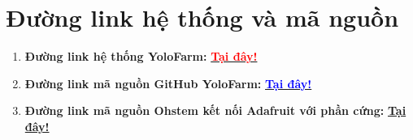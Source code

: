 \section{Đường link hệ thống và mã nguồn}
\begin{enumerate}[label=\textbf{\arabic*.}]
	\item \textbf{Đường link hệ thống YoloFarm:} \href{https://smart-farmsmart-life.vercel.app/}{\textbf{\textcolor{red}{Tại đây!}}}
	\item \textbf{Đường link mã nguồn GitHub YoloFarm:} \href{https://github.com/chicong14052005/yolofarm---group-6---L05---HK252}{\textbf{\textcolor{blue}{Tại đây!}}}
		\item \textbf{Đường link mã nguồn Ohstem kết nối Adafruit với phần cứng:} \href{https://drive.google.com/drive/folders/1luoOb33D9SPtXQeIRzD8dDfr7LhgvgMT?usp=sharing}{\textbf{\textcolor{green!50!black}{Tại đây!}}}
\end{enumerate}